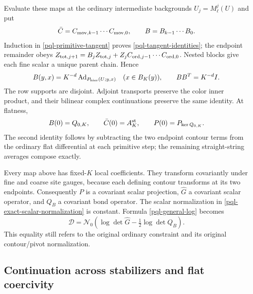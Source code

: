 Evaluate these maps at the ordinary intermediate backgrounds
$U_j=M_\ell^j(U)$ and put
\begin{equation}
 \bar C=C_{{\rm mov},k-1}\cdots C_{{\rm mov},0},\qquad
 B=B_{k-1}\cdots B_0.
 \label{pql-composite-tangent}
\end{equation}
Induction in \eqref{pql-primitive-tangent} proves
\eqref{pql-tangent-identities}; the endpoint remainder obeys
$Z_{{\rm tot},j+1}=B_jZ_{{\rm tot},j}+Z_jC_{{\rm ord},j-1}\cdots
C_{{\rm ord},0}$.
Nested blocks give each fine scalar a unique parent chain. Hence
\begin{equation}
 B(y,x)=K^{-d}\operatorname{Ad}_{P_{\rm hier}(U;y,x)}
       \quad(x\in B_K(y)),\qquad BB^T=K^{-d}I.
 \label{pql-exact-scalar-normalization}
\end{equation}
The row supports are disjoint. Adjoint transports preserve the color
inner product, and their bilinear complex continuations preserve the
same identity. At flatness,
\begin{equation}
 B(0)=Q_{0,K},\qquad \bar C(0)=A_K^{\rm st},\qquad
 P(0)=P_{\ker Q_{0,K}}.
 \label{pql-flat-maps}
\end{equation}
The second identity follows by subtracting the two endpoint contour
terms from the ordinary flat differential at each primitive step;
the remaining straight-string averages compose exactly.

Every map above has fixed-$K$ local coefficients. They transform
covariantly under fine and coarse site gauges, because each defining
contour transforms at its two endpoints. Consequently $P$ is a
covariant scalar projection, $\widehat G$ a covariant scalar operator,
and $Q_B$ a covariant bond operator. The scalar normalization in
\eqref{pql-exact-scalar-normalization} is constant. Formula
\eqref{pql-general-log} becomes
\begin{equation}
 \boxed{\displaystyle
 \mathcal D=\mathcal N_0\left(
           \log\det\widehat G-\tfrac12\log\det Q_B\right).}
 \label{pql-covariant-pair}
\end{equation}
This equality still refers to the original ordinary constraint and
its original contour/pivot normalization.

\subsection{Continuation across stabilizers and flat coercivity}
\label{pql-continuation}

